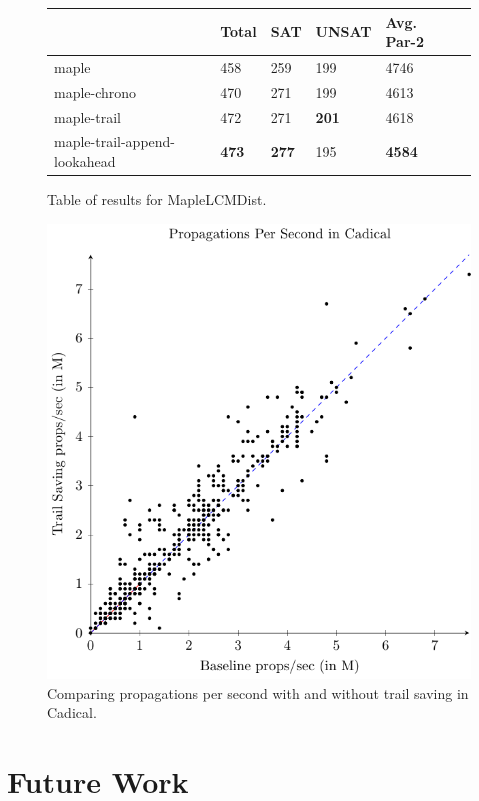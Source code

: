 \documentclass[runningheads]{llncs}
\begin{document}
\begin{figure}
\centering
    \begin{tabular}{|l|l|l|l|l|l|}
      \hline
      & Total & SAT & UNSAT & Avg. Par-2 \\ \hline
      maple           & 458          & 259 &  199  & 4746                             \\ \hline
      maple-chrono   & 470          & 271 &  199  & 4613                             \\ \hline
      maple-trail    & 472          & 271 &  \textbf{201}  & 4618                \\ \hline
      maple-trail-append-lookahead & \textbf{473} & \textbf{277} &  195  & \textbf{4584} \\ \hline
    \end{tabular}
    \caption{Table of results for MapleLCMDist.}
\end{figure}

\begin{figure} \centering \includegraphics[scale=0.7]{figures/scatter.pdf}\caption{Comparing propagations per second with and without trail saving in Cadical.}\end{figure}

\section{Future Work}
\end{document}
